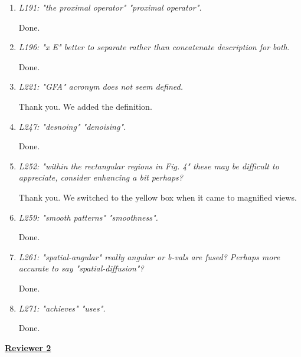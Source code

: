 \documentclass[a4paper,11pt,twoside]{report}
\begin{document}
\begin{enumerate}[resume]
    \item \textit{L191: "the proximal operator" \textrightarrow "proximal operator".}

    \hspace{1em} Done.

    \item \textit{L196: "x E" \textrightarrow better to separate rather than concatenate description for both.}

    \hspace{1em} Done.

    \item \textit{L221: "GFA" \textrightarrow acronym does not seem defined.}

    \hspace{1em} Thank you. We added the definition.

    \item \textit{L247: "desnoing" \textrightarrow "denoising".}

    \hspace{1em} Done.

    \item \textit{L252: "within the rectangular regions in Fig. 4" \textrightarrow these may be difficult to appreciate, consider enhancing a bit perhaps?}

    \hspace{1em} Thank you. We switched to the yellow box
    when it came to magnified views.

    \item \textit{L259: "smooth patterns" \textrightarrow "smoothness".}

    \hspace{1em} Done.

    \item \textit{L261: "spatial-angular" \textrightarrow really angular or b-vals are fused? Perhaps more accurate to say "spatial-diffusion"?}

    \hspace{1em} Done.

    \item \textit{L271: "achieves" \textrightarrow "uses".}

    \hspace{1em} Done.

\end{enumerate}


\clearpage
\noindent \underline{\textbf{Reviewer 2}}
\end{document}
